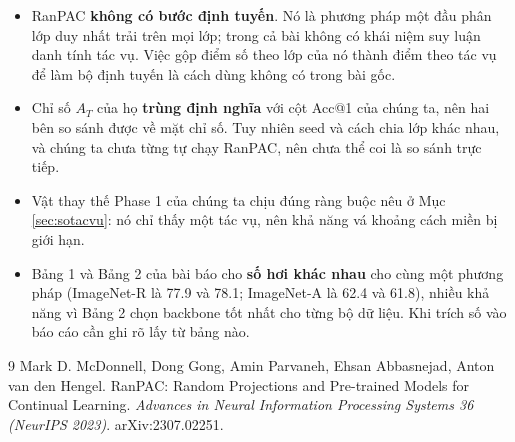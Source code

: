 \documentclass[11pt,a4paper]{article}
\begin{document}
\begin{itemize}[leftmargin=*]
\item RanPAC \textbf{không có bước định tuyến}. Nó là phương pháp một đầu phân
      lớp duy nhất trải trên mọi lớp; trong cả bài không có khái niệm suy luận
      danh tính tác vụ. Việc gộp điểm số theo lớp của nó thành điểm theo tác vụ
      để làm bộ định tuyến là cách dùng không có trong bài gốc.
\item Chỉ số $A_T$ của họ \textbf{trùng định nghĩa} với cột Acc@1 của chúng ta,
      nên hai bên so sánh được về mặt chỉ số. Tuy nhiên seed và cách chia lớp
      khác nhau, và chúng ta chưa từng tự chạy RanPAC, nên chưa thể coi là so
      sánh trực tiếp.
\item Vật thay thế Phase 1 của chúng ta chịu đúng ràng buộc nêu ở Mục
      \ref{sec:sotacvu}: nó chỉ thấy một tác vụ, nên khả năng vá khoảng cách miền
      bị giới hạn.
\item Bảng 1 và Bảng 2 của bài báo cho \textbf{số hơi khác nhau} cho cùng một
      phương pháp (ImageNet-R là 77.9 và 78.1; ImageNet-A là 62.4 và 61.8), nhiều
      khả năng vì Bảng 2 chọn backbone tốt nhất cho từng bộ dữ liệu. Khi trích số
      vào báo cáo cần ghi rõ lấy từ bảng nào.
\end{itemize}

\begin{thebibliography}{9}
Mark D. McDonnell, Dong Gong, Amin Parvaneh, Ehsan Abbasnejad, Anton van den
Hengel.
\newblock RanPAC: Random Projections and Pre-trained Models for Continual
Learning.
\newblock \emph{Advances in Neural Information Processing Systems 36 (NeurIPS
2023)}. arXiv:2307.02251.
\end{thebibliography}
\end{document}
